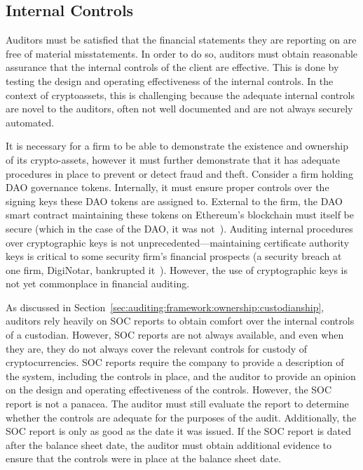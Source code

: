 \subsection{Internal Controls} \label{sec:auditing:framework:internalcontrol}
Auditors must be satisfied that the financial statements they are reporting on are free of material misstatements. In order to do so, auditors must obtain reasonable assurance that the internal controls of the client are effective. This is done by testing the design and operating effectiveness of the internal controls. In the context of cryptoassets, this is challenging because the adequate internal controls are novel to the auditors, often not well documented and are not always securely automated.

It is necessary for a firm to be able to demonstrate the existence and ownership of its crypto-assets, however it must further demonstrate that it has adequate procedures in place to prevent or detect fraud and theft. Consider a firm holding DAO governance tokens. Internally, it must ensure proper controls over the signing keys these DAO tokens are assigned to. External to the firm, the DAO smart contract maintaining these tokens on Ethereum's blockchain must itself be secure (which in the case of the DAO, it was not~\cite{siegel2016daohack}). Auditing internal procedures over cryptographic keys is not unprecedented---maintaining certificate authority keys is critical to some security firm's financial prospects (a security breach at one firm, DigiNotar, bankrupted it~\cite{van2013diginotar}). However, the use of cryptographic keys is not yet commonplace in financial auditing.

As discussed in Section~\ref{sec:auditing:framework:ownership:custodianship}, auditors rely heavily on SOC reports to obtain comfort over the internal controls of a custodian. However, SOC reports are not always available, and even when they are, they do not always cover the relevant controls for custody of cryptocurrencies. SOC reports require the company to provide a description of the system, including the controls in place, and the auditor to provide an opinion on the design and operating effectiveness of the controls. However, the SOC report is not a panacea. The auditor must still evaluate the report to determine whether the controls are adequate for the purposes of the audit. Additionally, the SOC report is only as good as the date it was issued. If the SOC report is dated after the balance sheet date, the auditor must obtain additional evidence to ensure that the controls were in place at the balance sheet date.

